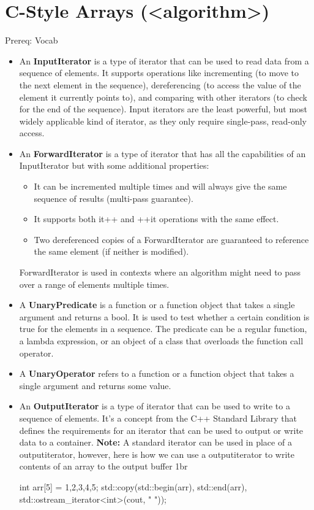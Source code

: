 \documentclass{report}
\begin{document}
    \pagebreak \bigbreak \noindent 
    \section{\LARGE C-Style Arrays (<algorithm>) }
    \bigbreak \noindent 
    Prereq: Vocab
    \begin{itemize}
        \item An \textbf{InputIterator} is a type of iterator that can be used to read data from a sequence of elements. It supports operations like incrementing (to move to the next element in the sequence), dereferencing (to access the value of the element it currently points to), and comparing with other iterators (to check for the end of the sequence). Input iterators are the least powerful, but most widely applicable kind of iterator, as they only require single-pass, read-only access.
        \item An \textbf{ForwardIterator} is a type of iterator that has all the capabilities of an InputIterator but with some additional properties:
            \begin{itemize}
                \item It can be incremented multiple times and will always give the same sequence of results (multi-pass guarantee).
                \item It supports both it++ and ++it operations with the same effect.
                \item Two dereferenced copies of a ForwardIterator are guaranteed to reference the same element (if neither is modified).
            \end{itemize}
            ForwardIterator is used in contexts where an algorithm might need to pass over a range of elements multiple times.
        \item A \textbf{UnaryPredicate} is a function or a function object that takes a single argument and returns a bool. It is used to test whether a certain condition is true for the elements in a sequence. The predicate can be a regular function, a lambda expression, or an object of a class that overloads the function call operator.
        \item A \textbf{UnaryOperator} refers to a function or a function object that takes a single argument and returns some value.
        \item An \textbf{OutputIterator} is a type of iterator that can be used to write to a sequence of elements. It's a concept from the C++ Standard Library that defines the requirements for an iterator that can be used to output or write data to a container. 
            \bigbreak \noindent 
            \textbf{Note:} A standard iterator can be used in place of a outputiterator, however, here is how we can use a outputiterator to write contents of an array to the output buffer
            1br
            \begin{cppcode}
                int arr[5] = {1,2,3,4,5};
                std::copy(std::begin(arr), std::end(arr), std::ostream_iterator<int>(cout, " "));
            \end{cppcode}
    \end{itemize}
\end{document}
